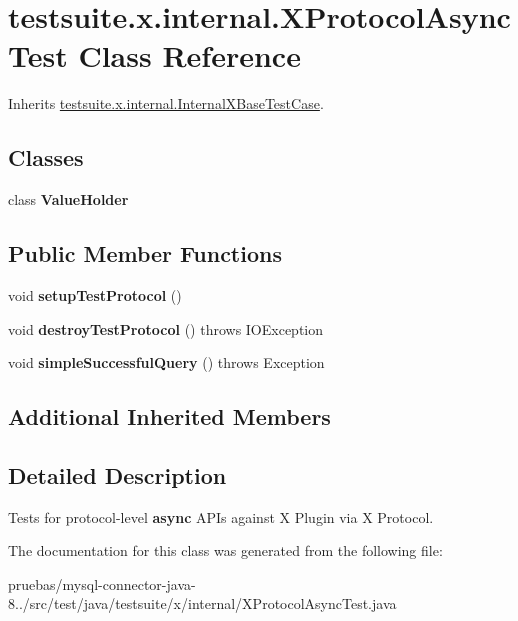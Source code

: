 \hypertarget{classtestsuite_1_1x_1_1internal_1_1_x_protocol_async_test}{}\section{testsuite.\+x.\+internal.\+X\+Protocol\+Async\+Test Class Reference}
\label{classtestsuite_1_1x_1_1internal_1_1_x_protocol_async_test}


Inherits \mbox{\hyperlink{classtestsuite_1_1x_1_1internal_1_1_internal_x_base_test_case}{testsuite.\+x.\+internal.\+Internal\+X\+Base\+Test\+Case}}.

\subsection*{Classes}
\begin{DoxyCompactItemize}
\item 
class {\bfseries Value\+Holder}
\end{DoxyCompactItemize}
\subsection*{Public Member Functions}
\begin{DoxyCompactItemize}
\item 
\mbox{\label{classtestsuite_1_1x_1_1internal_1_1_x_protocol_async_test_a2f32ab0cc64c56db3c3a71639955398e}} 
void {\bfseries setup\+Test\+Protocol} ()
\item 
\mbox{\label{classtestsuite_1_1x_1_1internal_1_1_x_protocol_async_test_a62b8ad9419eb87388de88604701812ae}} 
void {\bfseries destroy\+Test\+Protocol} ()  throws I\+O\+Exception 
\item 
\mbox{\label{classtestsuite_1_1x_1_1internal_1_1_x_protocol_async_test_a6d0464b3c0ac1fb46fb114a7fbf19fae}} 
void {\bfseries simple\+Successful\+Query} ()  throws Exception 
\end{DoxyCompactItemize}
\subsection*{Additional Inherited Members}


\subsection{Detailed Description}
Tests for protocol-\/level {\bfseries async} A\+P\+Is against X Plugin via X Protocol. 

The documentation for this class was generated from the following file\+:\begin{DoxyCompactItemize}
\item 
pruebas/mysql-\/connector-\/java-\/8../src/test/java/testsuite/x/internal/X\+Protocol\+Async\+Test.\+java\end{DoxyCompactItemize}
